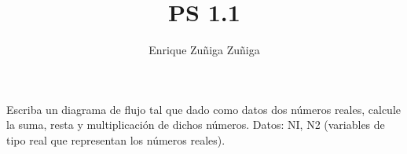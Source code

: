 \documentclass[11pt]{amsart}
\title{PS 1.1}
\author{Enrique Zuñiga Zuñiga}
\begin{document}
\maketitle
\noindent Escriba un diagrama de flujo tal que dado como datos dos números reales, calcule la suma, resta y multiplicación de dichos números.\newline
Datos: NI, N2 (variables de tipo real que representan los números reales).\newline
\end{document}
